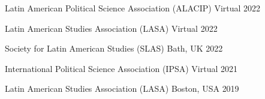 






\vspace{1mm}

\begin{cvhonors}
\cvconf
{Latin American Political Science Association (ALACIP)} 
{Virtual}
{2022}
\end{cvhonors}

\begin{cvhonors}
\cvconf
{Latin American Studies Association (LASA)} 
{Virtual}
{2022}
\end{cvhonors}

\begin{cvhonors}
\cvconf
{Society for Latin American Studies (SLAS)} 
{Bath, UK}
{2022}
\end{cvhonors}


\begin{cvhonors}
\cvconf
{International Political Science Association (IPSA)} 
{Virtual}
{2021}
\end{cvhonors}

\begin{cvhonors}
\cvconf
{Latin American Studies Association (LASA)} 
{Boston, USA}
{2019}
\end{cvhonors}

